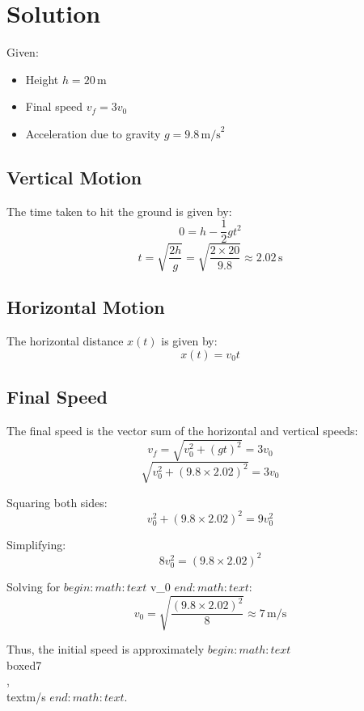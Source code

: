 \documentclass{article}
\begin{document}
\section*{Solution}

Given:
\begin{itemize}
    \item Height \( h = 20 \, \text{m} \)
    \item Final speed \( v_f = 3v_0 \)
    \item Acceleration due to gravity \( g = 9.8 \, \text{m/s}^2 \)
\end{itemize}

\subsection*{Vertical Motion}
The time taken to hit the ground is given by:
\[
0 = h - \frac{1}{2}gt^2
\]
\[
t = \sqrt{\frac{2h}{g}} = \sqrt{\frac{2 \times 20}{9.8}} \approx 2.02 \, \text{s}
\]

\subsection*{Horizontal Motion}
The horizontal distance \( x(t) \) is given by:
\[
x(t) = v_0 t
\]

\subsection*{Final Speed}
The final speed is the vector sum of the horizontal and vertical speeds:
\[
v_f = \sqrt{v_0^2 + (gt)^2} = 3v_0
\]
\[
\sqrt{v_0^2 + (9.8 \times 2.02)^2} = 3v_0
\]

Squaring both sides:
\[
v_0^2 + (9.8 \times 2.02)^2 = 9v_0^2
\]

Simplifying:
\[
8v_0^2 = (9.8 \times 2.02)^2
\]

Solving for $begin:math:text$ v_0 $end:math:text$:
\[
v_0 = \sqrt{\frac{(9.8 \times 2.02)^2}{8}} \approx 7 \, \text{m/s}
\]

Thus, the initial speed is approximately $begin:math:text$ \\boxed{7 \\, \\text{m/s}} $end:math:text$.
\end{document}
